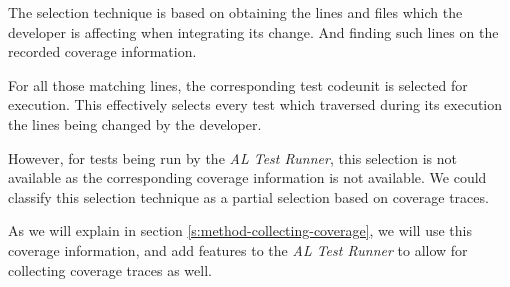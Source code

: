 The selection technique is based on obtaining the lines and files which the developer is
affecting when integrating its change. And finding such lines on the recorded coverage information.

For all those matching lines, the corresponding test codeunit is selected for execution. This 
effectively selects every test which traversed during its execution the lines being changed
by the developer.

However, for tests being run by the \emph{AL Test Runner}, this selection is not available as the corresponding 
coverage information is not available. We could classify this selection technique as a partial selection
based on coverage traces.

As we will explain in section \ref{s:method-collecting-coverage}, we will use this coverage 
information, and add features to the \emph{AL Test Runner} to allow for collecting coverage
traces as well.